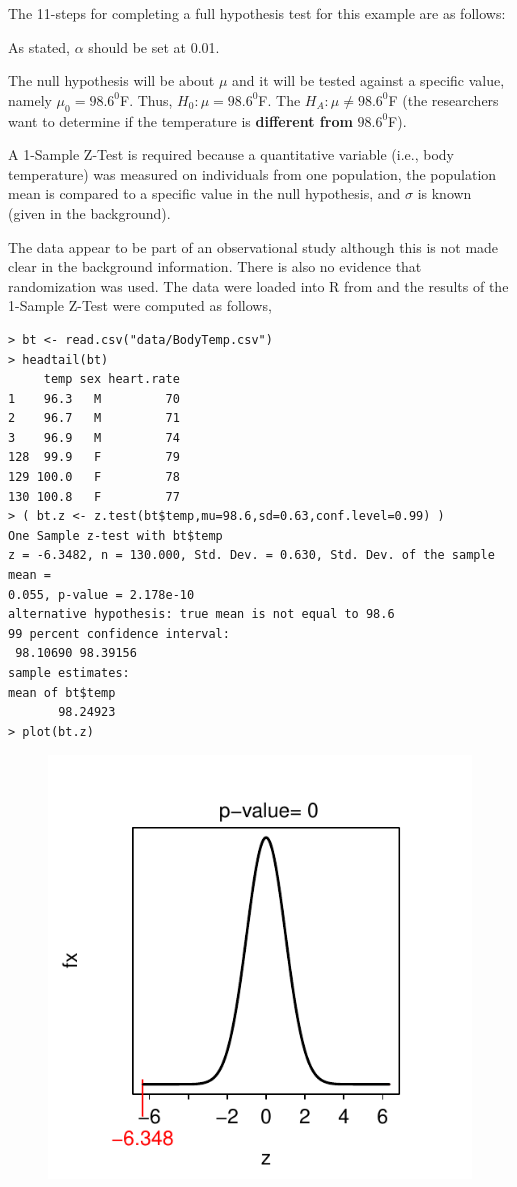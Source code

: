 \documentclass[10pt,openany]{book}\usepackage[]{graphicx}\usepackage[]{color}
\makeatletter
\newenvironment{kframe}{%
 \def\at@end@of@kframe{}%
 \ifinner\ifhmode%
  \def\at@end@of@kframe{\end{minipage}}%
  \begin{minipage}{\columnwidth}%
 \fi\fi%
 \def\FrameCommand##1{\hskip\@totalleftmargin \hskip-\fboxsep
 \colorbox{shadecolor}{##1}\hskip-\fboxsep
     \hskip-\linewidth \hskip-\@totalleftmargin \hskip\columnwidth}%
 \MakeFramed {\advance\hsize-\width
   \@totalleftmargin\z@ \linewidth\hsize
   \@setminipage}}%
 {\par\unskip\endMakeFramed%
 \at@end@of@kframe}
\newenvironment{knitrout}{}{} %
\makeatother
\begin{document}
The 11-steps  for completing a full hypothesis test for this example are as follows:
\begin{Enumerate}
  \item As stated, $\alpha$ should be set at 0.01.
  \item The null hypothesis will be about $\mu$ and it will be tested against a specific value, namely $\mu_{0}=98.6^{0}$F.  Thus, $H_{0}:\mu=98.6^{0}$F.  The $H_{A}:\mu\neq98.6^{0}$F (the researchers want to determine if the temperature is \textbf{different from} $98.6^{0}$F).
  \item A 1-Sample Z-Test is required because a quantitative variable (i.e., body temperature) was measured on individuals from one population, the population mean is compared to a specific value in the null hypothesis, and $\sigma$ is known (given in the background).
  \item The data appear to be part of an observational study although this is not made clear in the background information.  There is also no evidence that randomization was used.  The data were loaded into R from  and the results of the 1-Sample Z-Test were computed as follows,
\begin{knitrout}
\color{fgcolor}\begin{kframe}
\begin{verbatim}
> bt <- read.csv("data/BodyTemp.csv")
> headtail(bt)
     temp sex heart.rate
1    96.3   M         70
2    96.7   M         71
3    96.9   M         74
128  99.9   F         79
129 100.0   F         78
130 100.8   F         77
> ( bt.z <- z.test(bt$temp,mu=98.6,sd=0.63,conf.level=0.99) )
One Sample z-test with bt$temp 
z = -6.3482, n = 130.000, Std. Dev. = 0.630, Std. Dev. of the sample mean =
0.055, p-value = 2.178e-10
alternative hypothesis: true mean is not equal to 98.6 
99 percent confidence interval:
 98.10690 98.39156 
sample estimates:
mean of bt$temp 
       98.24923 
> plot(bt.z)
\end{verbatim}
\end{kframe}\begin{figure}[!h]

{\centering \includegraphics[width=.3\linewidth]{Figs/Ex2Zpvalue-1} 

}
\end{figure}
\end{knitrout}
\end{Enumerate}
\end{document}
